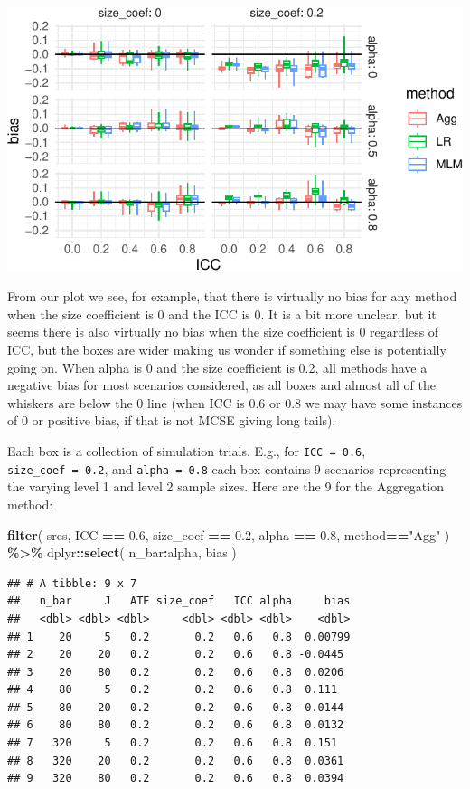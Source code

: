 \documentclass[
]{book}
\newenvironment{Shaded}{\begin{snugshade}}{\end{snugshade}}
\newcommand{\FloatTok}[1]{\textcolor[rgb]{0.00,0.00,0.81}{#1}}
\newcommand{\FunctionTok}[1]{\textcolor[rgb]{0.13,0.29,0.53}{\textbf{#1}}}
\newcommand{\NormalTok}[1]{#1}
\newcommand{\SpecialCharTok}[1]{\textcolor[rgb]{0.81,0.36,0.00}{\textbf{#1}}}
\newcommand{\StringTok}[1]{\textcolor[rgb]{0.31,0.60,0.02}{#1}}
\begin{document}
\begin{center}\includegraphics[width=0.75\linewidth]{Designing-Simulations-in-R_files/figure-latex/clusterRCT_plot_bias_v1-1} \end{center}

From our plot we see, for example, that there is virtually no bias for any method when the size coefficient is 0 and the ICC is 0.
It is a bit more unclear, but it seems there is also virtually no bias when the size coefficient is 0 regardless of ICC, but the boxes are wider making us wonder if something else is potentially going on.
When alpha is 0 and the size coefficient is 0.2, all methods have a negative bias for most scenarios considered, as all boxes and almost all of the whiskers are below the 0 line (when ICC is 0.6 or 0.8 we may have some instances of 0 or positive bias, if that is not MCSE giving long tails).

Each box is a collection of simulation trials. E.g., for \texttt{ICC\ =\ 0.6}, \texttt{size\_coef\ =\ 0.2}, and \texttt{alpha\ =\ 0.8} each box contains 9 scenarios representing the varying level 1 and level 2 sample sizes.
Here are the 9 for the Aggregation method:

\begin{Shaded}
\begin{Highlighting}[]
\FunctionTok{filter}\NormalTok{( sres, ICC }\SpecialCharTok{==} \FloatTok{0.6}\NormalTok{, size\_coef }\SpecialCharTok{==} \FloatTok{0.2}\NormalTok{,}
\NormalTok{        alpha }\SpecialCharTok{==} \FloatTok{0.8}\NormalTok{, method}\SpecialCharTok{==}\StringTok{"Agg"}\NormalTok{ ) }\SpecialCharTok{\%\textgreater{}\%}
\NormalTok{  dplyr}\SpecialCharTok{::}\FunctionTok{select}\NormalTok{( n\_bar}\SpecialCharTok{:}\NormalTok{alpha, bias )}
\end{Highlighting}
\end{Shaded}

\begin{verbatim}
## # A tibble: 9 x 7
##   n_bar     J   ATE size_coef   ICC alpha     bias
##   <dbl> <dbl> <dbl>     <dbl> <dbl> <dbl>    <dbl>
## 1    20     5   0.2       0.2   0.6   0.8  0.00799
## 2    20    20   0.2       0.2   0.6   0.8 -0.0445 
## 3    20    80   0.2       0.2   0.6   0.8  0.0206 
## 4    80     5   0.2       0.2   0.6   0.8  0.111  
## 5    80    20   0.2       0.2   0.6   0.8 -0.0144 
## 6    80    80   0.2       0.2   0.6   0.8  0.0132 
## 7   320     5   0.2       0.2   0.6   0.8  0.151  
## 8   320    20   0.2       0.2   0.6   0.8  0.0361 
## 9   320    80   0.2       0.2   0.6   0.8  0.0394
\end{verbatim}
\end{document}
